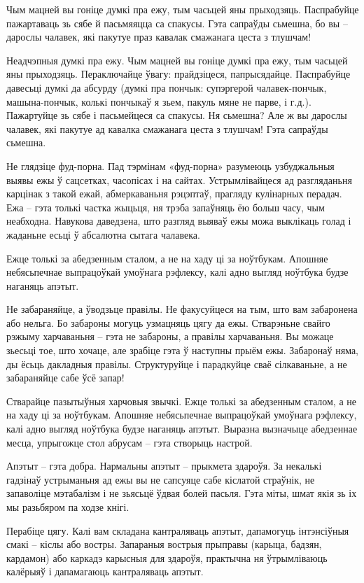 Чым мацней вы гоніце думкі пра ежу, тым часьцей яны прыходзяць. Паспрабуйце пажартаваць зь сябе й пасьмяяцца са спакусы. Гэта сапраўды сьмешна, бо вы – дарослы чалавек, які пакутуе праз кавалак смажанага цеста з тлушчам!

Неадчэпныя думкі пра ежу.
Чым мацней вы гоніце думкі пра ежу, тым часьцей яны прыходзяць. Пераключайце ўвагу: прайдзіцеся, папрысядайце. Паспрабуйце давесьці думкі да абсурду (думкі пра пончык: супэргерой чалавек-пончык, машына-пончык, колькі пончыкаў я зьем, пакуль мяне не парве, і г.д.). Пажартуйце зь сябе і пасьмейцеся са спакусы. Ня сьмешна? Але ж вы дарослы чалавек, які пакутуе ад кавалка смажанага цеста з тлушчам! Гэта сапраўды сьмешна.

Не глядзіце фуд-порна.
Пад тэрмінам «фуд-порна» разумеюць узбуджальныя выявы ежы ў сацсетках, часопісах і на сайтах. Устрымлівайцеся ад разгляданьня карцінак з такой ежай, абмеркаваньня рэцэптаў, прагляду кулінарных перадач. Ежа – гэта толькі частка жыцьця, ня трэба запаўняць ёю больш часу, чым неабходна. Навукова даведзена, што разгляд выяваў ежы можа выклікаць голад і жаданьне есьці ў абсалютна сытага чалавека.

Ежце толькі за абедзенным сталом, а не на хаду ці за ноўтбукам. Апошняе небясьпечнае выпрацоўкай умоўнага рэфлексу, калі адно выгляд ноўтбука будзе наганяць апэтыт.

Не забараняйце, а ўводзьце правілы. 
Не факусуйцеся на тым, што вам забаронена або нельга. Бо забароны могуць узмацняць цягу да ежы. Стварэньне свайго рэжыму харчаваньня – гэта не забароны, а правілы харчаваньня. Вы можаце зьесьці тое, што хочаце, але зрабіце гэта ў наступны прыём ежы. Забаронаў няма, ды ёсьць дакладныя правілы. Структуруйце і парадкуйце сваё сілкаваньне, а не забараняйце сабе ўсё запар!

Стварайце пазытыўныя харчовыя звычкі. 
Ежце толькі за абедзенным сталом, а не на хаду ці за ноўтбукам. Апошняе небясьпечнае выпрацоўкай умоўнага рэфлексу, калі адно выгляд ноўтбука будзе наганяць апэтыт. Выразна вызначыце абедзеннае месца, упрыгожце стол абрусам – гэта створыць настрой.

Апэтыт – гэта добра. 
Нармальны апэтыт – прыкмета здароўя. За некалькі гадзінаў устрыманьня ад ежы вы не сапсуяце сабе кіслатой страўнік, не запаволіце мэтабалізм і не зьясьцё ўдвая болей пасьля. Гэта міты, шмат якія зь іх мы разьбяром па ходзе кнігі.

Перабіце цягу. 
Калі вам складана кантраляваць апэтыт, дапамогуць інтэнсіўныя смакі – кіслы або востры. Запараныя вострыя прыправы (карыца, бадзян, кардамон) або каркадэ карысныя для здароўя, практычна ня ўтрымліваюць калёрыяў і дапамагаюць кантраляваць апэтыт.

